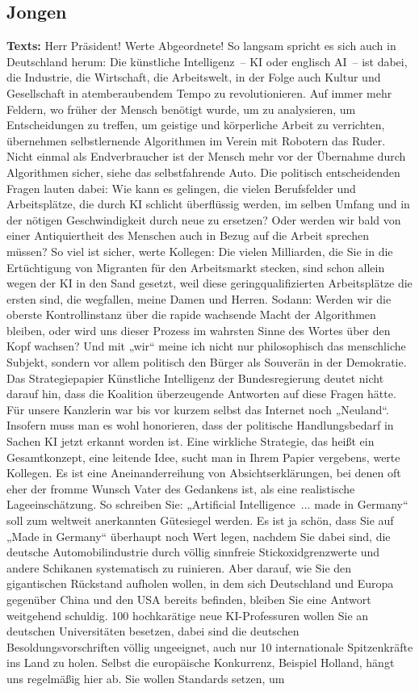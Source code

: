 \documentclass{article}
\begin{document}
\subsection{Jongen}
\noindent\textbf{Texts:} Herr Präsident! Werte Abgeordnete! So langsam spricht es sich auch in Deutschland herum: Die künstliche Intelligenz – KI oder englisch AI – ist dabei, die Industrie, die Wirtschaft, die Arbeitswelt, in der Folge auch Kultur und Gesellschaft in atemberaubendem Tempo zu revolutionieren. Auf immer mehr Feldern, wo früher der Mensch benötigt wurde, um zu analysieren, um Entscheidungen zu treffen, um geistige und körperliche Arbeit zu verrichten, übernehmen selbstlernende Algorithmen im Verein mit Robotern das Ruder. Nicht einmal als Endverbraucher ist der Mensch mehr vor der Übernahme durch Algorithmen sicher, siehe das selbstfahrende Auto. Die politisch entscheidenden Fragen lauten dabei: Wie kann es gelingen, die vielen Berufsfelder und Arbeitsplätze, die durch KI schlicht überflüssig werden, im selben Umfang und in der nötigen Geschwindigkeit durch neue zu ersetzen? Oder werden wir bald von einer Antiquiertheit des Menschen auch in Bezug auf die Arbeit sprechen müssen? So viel ist sicher, werte Kollegen: Die vielen Milliarden, die Sie in die Ertüchtigung von Migranten für den Arbeitsmarkt stecken,  sind schon allein wegen der KI in den Sand gesetzt, weil diese geringqualifizierten Arbeitsplätze die ersten sind, die wegfallen, meine Damen und Herren.  Sodann: Werden wir die oberste Kontrollinstanz über die rapide wachsende Macht der Algorithmen bleiben, oder wird uns dieser Prozess im wahrsten Sinne des Wortes über den Kopf wachsen? Und mit „wir“ meine ich nicht nur philosophisch das menschliche Subjekt, sondern vor allem politisch den Bürger als Souverän in der Demokratie. Das Strategiepapier Künstliche Intelligenz der Bundesregierung deutet nicht darauf hin, dass die Koalition überzeugende Antworten auf diese Fragen hätte. Für unsere Kanzlerin war bis vor kurzem selbst das Internet noch „Neuland“. Insofern muss man es wohl honorieren, dass der politische Handlungsbedarf in Sachen KI jetzt erkannt worden ist. Eine wirkliche Strategie, das heißt ein Gesamtkonzept, eine leitende Idee, sucht man in Ihrem Papier vergebens, werte Kollegen. Es ist eine Aneinanderreihung von Absichtserklärungen, bei denen oft eher der fromme Wunsch Vater des Gedankens ist, als eine realistische Lageeinschätzung.  So schreiben Sie: „Artificial Intelligence ... made in Germany“ soll zum weltweit anerkannten Gütesiegel werden. Es ist ja schön, dass Sie auf „Made in Germany“ überhaupt noch Wert legen, nachdem Sie dabei sind, die deutsche Automobilindustrie durch völlig sinnfreie Stickoxidgrenzwerte und andere Schikanen systematisch zu ruinieren. Aber darauf, wie Sie den gigantischen Rückstand aufholen wollen, in dem sich Deutschland und Europa gegenüber China und den USA bereits befinden, bleiben Sie eine Antwort weitgehend schuldig. 100 hochkarätige neue KI-Professuren wollen Sie an deutschen Universitäten besetzen, dabei sind die deutschen Besoldungsvorschriften völlig ungeeignet, auch nur 10 internationale Spitzenkräfte ins Land zu holen. Selbst die europäische Konkurrenz, Beispiel Holland, hängt uns regelmäßig hier ab. Sie wollen Standards setzen, um 
\end{document}
